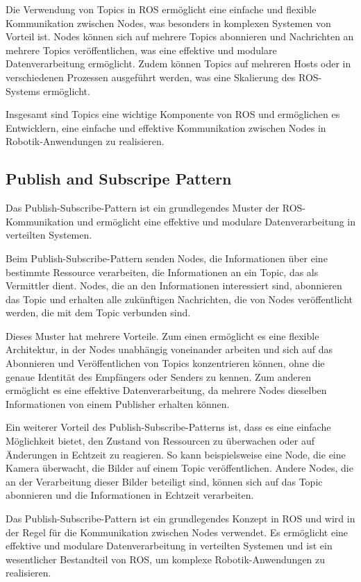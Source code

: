     Die Verwendung von Topics in \ac{ROS} ermöglicht eine einfache und flexible Kommunikation zwischen Nodes, was besonders in komplexen Systemen von Vorteil ist. Nodes können sich auf mehrere Topics abonnieren und Nachrichten an mehrere Topics veröffentlichen, was eine effektive und modulare Datenverarbeitung ermöglicht. Zudem können Topics auf mehreren Hosts oder in verschiedenen Prozessen ausgeführt werden, was eine Skalierung des \ac{ROS}-Systems ermöglicht.

    Insgesamt sind Topics eine wichtige Komponente von \ac{ROS} und ermöglichen es Entwicklern, eine einfache und effektive Kommunikation zwischen Nodes in Robotik-Anwendungen zu realisieren.

    \subsection{Publish and Subscripe Pattern} \label{publish_and_subscripe_pattern:subsection}
    Das Publish-Subscribe-Pattern ist ein grundlegendes Muster der \ac{ROS}-Kommunikation und ermöglicht eine effektive und modulare Datenverarbeitung in verteilten Systemen.

    Beim Publish-Subscribe-Pattern senden Nodes, die Informationen über eine bestimmte Ressource verarbeiten, die Informationen an ein Topic, das als Vermittler dient. Nodes, die an den Informationen interessiert sind, abonnieren das Topic und erhalten alle zukünftigen Nachrichten, die von Nodes veröffentlicht werden, die mit dem Topic verbunden sind.

    Dieses Muster hat mehrere Vorteile. Zum einen ermöglicht es eine flexible Architektur, in der Nodes unabhängig voneinander arbeiten und sich auf das Abonnieren und Veröffentlichen von Topics konzentrieren können, ohne die genaue Identität des Empfängers oder Senders zu kennen. Zum anderen ermöglicht es eine effektive Datenverarbeitung, da mehrere Nodes dieselben Informationen von einem Publisher erhalten können.

    Ein weiterer Vorteil des Publish-Subscribe-Patterns ist, dass es eine einfache Möglichkeit bietet, den Zustand von Ressourcen zu überwachen oder auf Änderungen in Echtzeit zu reagieren. So kann beispielsweise eine Node, die eine Kamera überwacht, die Bilder auf einem Topic veröffentlichen. Andere Nodes, die an der Verarbeitung dieser Bilder beteiligt sind, können sich auf das Topic abonnieren und die Informationen in Echtzeit verarbeiten.

    Das Publish-Subscribe-Pattern ist ein grundlegendes Konzept in \ac{ROS} und wird in der Regel für die Kommunikation zwischen Nodes verwendet. Es ermöglicht eine effektive und modulare Datenverarbeitung in verteilten Systemen und ist ein wesentlicher Bestandteil von \ac{ROS}, um komplexe Robotik-Anwendungen zu realisieren.

